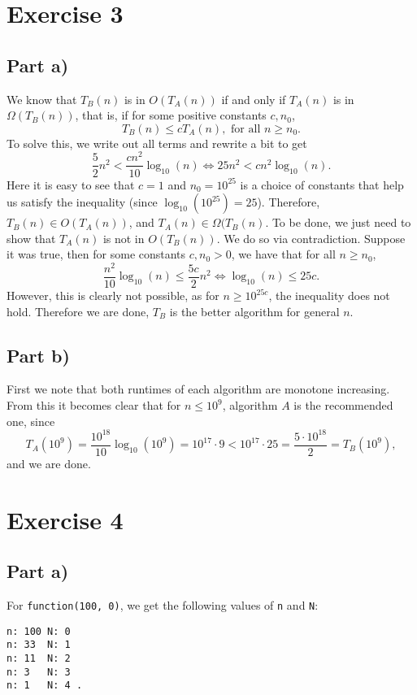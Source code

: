 \documentclass{article}
\begin{document}
\section*{Exercise 3}
\subsection*{Part a)}
We know that $T_{B}(n)$ is in $O(T_{A}(n))$ if and only if 
$T_{A}(n)$ is in $\Omega(T_{B}(n))$, that is, if for some positive constants
$c,n_0$, \[
T_{B}(n) \leq cT_{A}\left( n \right), \text{ for all } n \geq  n_0.
\] To solve this, we write out all terms and rewrite a bit to get \[
\frac{5}{2}n^2 < \frac{cn^2}{10}\log_{10}(n) \iff 25 n^2 
< cn^2\log_{10}(n).
\] Here it is easy to see that $c=1$ and $n_0=10^{25}$ is a choice of
constants that help us satisfy the inequality (since $\log_{10}(10^{25})=25$).
Therefore, $T_{B}(n) \in O(T_{A}\left(n \right) )$, and $T_{A}(n) \in \Omega(T_{B}(n)$. 
\bigskip \newline
To be done, we just need to show that $T_{A}(n)$ is not in $O(T_{B}(n))$. We do so via 
contradiction. Suppose it was true, then for some constants $c,n_0  >0$, we have that for all
$n\geq n_0$, \[
\frac{n^2}{10}\log_{10}(n) \leq \frac{5c}{2}n^2 \iff \log_{10}(n) \leq 25c.
\] However, this is clearly not possible, as for $n\geq 10^{25c}$, the inequality does not hold.
Therefore we are done, $T_{B}$ is the better algorithm for general $n$.


\subsection*{Part b)}
First we note that both runtimes of each algorithm are monotone increasing.
From this it becomes clear that for $n\leq 10^{9}$, algorithm $A$ is the 
recommended one, since \[
    T_{A}(10^{9})=\frac{10^{18}}{10}\log_{10}(10^9)= 10^{17}\cdot 9 < 
    10^{17}\cdot 25 =  \frac{5\cdot 10^{18}}{2} = T_{B}(10^{9}),
\] and we are done.

\section*{Exercise 4}
\subsection*{Part a)}
For \texttt{function(100, 0)}, we get the following values of 
\texttt{n} and  \texttt{N}:
\begin{lstlisting}
n: 100 N: 0
n: 33  N: 1
n: 11  N: 2
n: 3   N: 3
n: 1   N: 4 .
\end{lstlisting}
\end{document}
